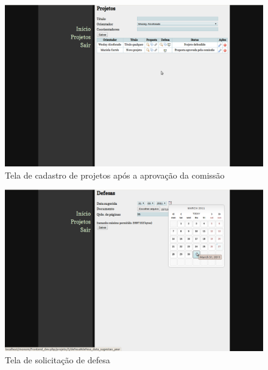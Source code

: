 \begin{figure}[htbp]
\centering
\includegraphics[width=1\textwidth]{fig/telas/processo/aluno_06_proposta_aprovada_comissao.png}
\caption{Tela de cadastro de projetos após a aprovação da comissão}
\label{fig:aluno_06_proposta_aprovada_comissao}
\end{figure}

\begin{figure}[htbp]
\centering
\includegraphics[width=1\textwidth]{fig/telas/processo/aluno_07_submetendo_defesa.png}
\caption{Tela de solicitação de defesa}
\label{fig:aluno_07_submetendo_defesa}
\end{figure}

